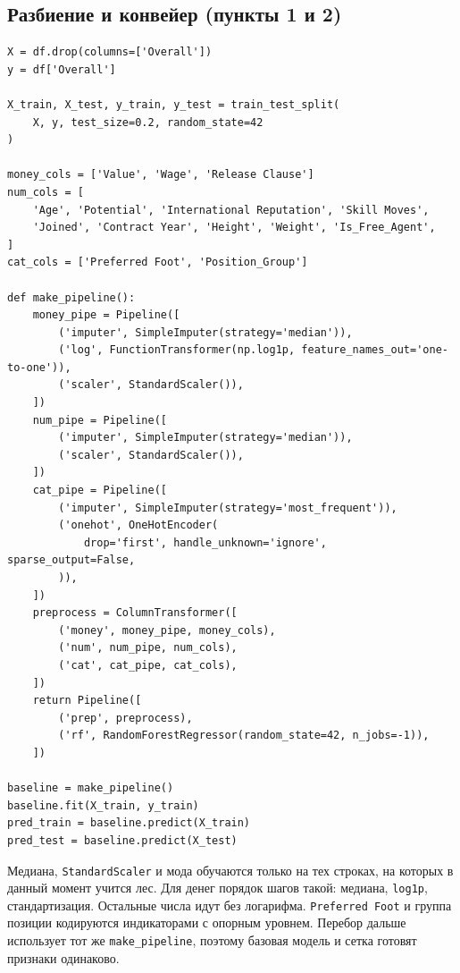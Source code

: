 \documentclass[14pt]{extarticle}
\begin{document}
\subsection{Разбиение и конвейер (пункты 1 и 2)}
\begin{verbatim}
X = df.drop(columns=['Overall'])
y = df['Overall']

X_train, X_test, y_train, y_test = train_test_split(
    X, y, test_size=0.2, random_state=42
)

money_cols = ['Value', 'Wage', 'Release Clause']
num_cols = [
    'Age', 'Potential', 'International Reputation', 'Skill Moves',
    'Joined', 'Contract Year', 'Height', 'Weight', 'Is_Free_Agent',
]
cat_cols = ['Preferred Foot', 'Position_Group']

def make_pipeline():
    money_pipe = Pipeline([
        ('imputer', SimpleImputer(strategy='median')),
        ('log', FunctionTransformer(np.log1p, feature_names_out='one-to-one')),
        ('scaler', StandardScaler()),
    ])
    num_pipe = Pipeline([
        ('imputer', SimpleImputer(strategy='median')),
        ('scaler', StandardScaler()),
    ])
    cat_pipe = Pipeline([
        ('imputer', SimpleImputer(strategy='most_frequent')),
        ('onehot', OneHotEncoder(
            drop='first', handle_unknown='ignore', sparse_output=False,
        )),
    ])
    preprocess = ColumnTransformer([
        ('money', money_pipe, money_cols),
        ('num', num_pipe, num_cols),
        ('cat', cat_pipe, cat_cols),
    ])
    return Pipeline([
        ('prep', preprocess),
        ('rf', RandomForestRegressor(random_state=42, n_jobs=-1)),
    ])

baseline = make_pipeline()
baseline.fit(X_train, y_train)
pred_train = baseline.predict(X_train)
pred_test = baseline.predict(X_test)
\end{verbatim}

Медиана, \texttt{StandardScaler} и мода обучаются только на тех строках, на которых в данный момент учится лес. Для денег порядок шагов такой: медиана, \texttt{log1p}, стандартизация. Остальные числа идут без логарифма. \texttt{Preferred Foot} и группа позиции кодируются индикаторами с опорным уровнем. Перебор дальше использует тот же \texttt{make\_pipeline}, поэтому базовая модель и сетка готовят признаки одинаково.
\end{document}
